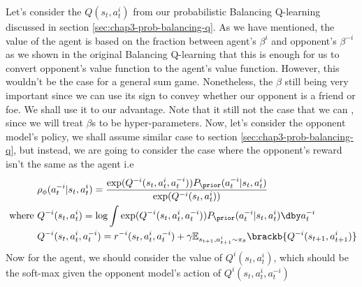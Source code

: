 \label{sec:chap4-gen-extension}
Let's consider the $Q(s_t, a^{i}_t)$ from our probabilistic Balancing Q-learning discussed in section \ref{sec:chap3-prob-balancing-q}. As we have mentioned, the value of the agent is based on the fraction between agent's $\beta^i$ and opponent's $\beta^{-i}$ as we shown in the original Balancing Q-learning that this is enough for us to convert opponent's value function to the agent's value function. However, this wouldn't be the case for a general sum game. Nonetheless, the $\beta$ still being very important since we can use its sign to convey whether our opponent is a friend or foe. We shall use it to our advantage. Note that it still not the case that we can , since we will treat $\beta$s to be hyper-parameters. Now, let's consider the opponent model's policy, we shall assume similar case to section \ref{sec:chap3-prob-balancing-q}, but instead, we are going to consider the case where the opponent's reward isn't the same as the agent i.e 
\begin{equation}
\begin{aligned}
\label{eqn:chap3-prob-opponent}
    &\rho_{\phi}(a^{-i}_t | s_t, a^i_t) = \frac{\exp(Q^{-i}(s_t, a^i_t, a^{-i}_t))P_\prior(a^{-i}_t | s_t, a^i_t)}{\exp(Q^{-i}(s_t, a^{i}_t))} \\
    \text{ where }&Q^{-i}(s_t, a^{i}_t) = \log \int \exp(Q^{-i}(s_t, a^i_t, a^{-i}_t))P_\prior(a^{-i}_t | s_t, a^i_t) \dby a^{-i}_t \\
    &Q^{-i}(s_t, a^i_t, a^{-i}_t) = r^{-i}(s_t, a^i_t, a^{-i}_t) + \gamma \mathbb{E}_{s_{t+1}, a^{i}_{t+1}\sim\pi_\theta}\brackb{Q^{-i}(s_{t+1}, a^{i}_{t+1})}
\end{aligned}
\end{equation}
Now for the agent, we should consider the value of $Q^{i}(s_t, a^{i}_t)$, which should be the soft-max given the opponent model's action of $Q^{i}(s_t, a^{i}_t, a^{-i}_t)$